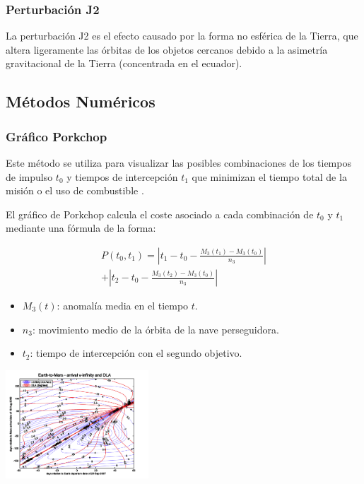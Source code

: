 \subsubsection{Perturbación J2}
La perturbación J2 es el efecto causado por la
forma no esférica de la Tierra, que altera ligeramente las órbitas de
los objetos cercanos debido a la asimetría gravitacional de la Tierra
(concentrada en el ecuador).
%
\subsection{Métodos Numéricos}
\subsubsection{Gráfico Porkchop}
Este método se utiliza para visualizar las posibles combinaciones de
los tiempos de impulso $t_0$ y tiempos de intercepción $t_1$ que minimizan
el tiempo total de la misión o el uso de combustible \parencite{DUAN2020965}.

El gráfico de Porkchop calcula el coste asociado a cada combinación
de $t_0$ y $t_1$ mediante una fórmula de la forma:

\begin{equation}
    \begin{split}
        P(t_0, t_1) = \left| t_1 - t_0 - \frac{M_3(t_1) - M_3(t_0)}{n_3} \right| \\
        + \left| t_2 - t_0 - \frac{M_3(t_2) - M_3(t_0)}{n_3} \right|
    \end{split}
\end{equation}


\begin{itemize}
    \item $M_3(t)$: anomalía media en el tiempo $t$.
    \item $n_3$: movimiento medio de la órbita de la nave perseguidora.
    \item $t_2$: tiempo de intercepción con el segundo objetivo.
\end{itemize}

\begin{center}
    \includegraphics[width=0.4\textwidth]{porkchop_ejemplo.png}
     \parencite{eagle2025}
\end{center}

